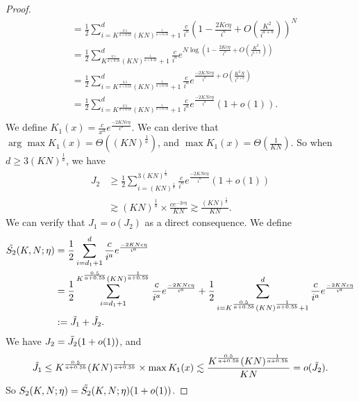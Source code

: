 \begin{proof}
\begin{align*}
    &=\frac{1}{2}\sum_{i=K^{\frac{0.5}{a+0.5b}}(KN)^{\frac{1}{a+0.5b}}+1}^{d}\frac{c}{i^{a}}\left(1-\frac{2Kc\eta}{i^{a}}+O\left(\frac{K^2}{i^{a+b}}\right)\right)^N \\
    &=\frac{1}{2}\sum_{K^{\frac{0.5}{a+0.5b}}(KN)^{\frac{1}{a+0.5b}}+1}^{d}\frac{c}{i^{a}}e^{N\log \left(1-\frac{2Kc\eta}{i^{a}}+O\left(\frac{K^2}{i^{a+b}}\right)\right)} \\
    &=\frac{1}{2}\sum_{i=K^{\frac{0.5}{a+0.5b}}(KN)^{\frac{1}{a+0.5b}}+1}^{d}\frac{c}{i^{a}}e^{\frac{-2KNc\eta}{i^{a}}+O\left(\frac{K^2N}{i^{a+b}}\right)} \\
    &=\frac{1}{2}\sum_{i=K^{\frac{0.5}{a+0.5b}}(KN)^{\frac{1}{a+0.5b}}+1}^{d}\frac{c}{i^{a}}e^{\frac{-2KNc\eta}{i^{a}}}(1+o(1)). \\
\end{align*}
We define $K_1(x) = \frac{c}{x^{a}}e^{\frac{-2KNc\eta}{x^{a}}}$.
We can derive that $\arg\max K_1(x) = \Theta\left((KN)^{\frac{1}{a}}\right)$, and $\max K_1(x) = \Theta\left(\frac{1}{KN}\right)$.
So when $d\geq 3(KN)^{\frac{1}{a}}$, we have
\begin{align*}
    J_2&\geq \frac{1}{2}\sum_{i=(KN)^{\frac{1}{a}}}^{3(KN)^{\frac{1}{a}}}\frac{c}{i^{a}}e^{\frac{-2KNc\eta}{i^{a}}}(1+o(1)) \\
    &\gtrsim (KN)^{\frac{1}{a}}\times\frac{ce^{-2c\eta}}{KN}\gtrsim\frac{(KN)^{\frac{1}{a}}}{KN}.
\end{align*}
We can verify that $J_1 = o(J_2)$ as a direct consequence.
We define 
\begin{align*}
    \Tilde{S_2}(K, N;\eta) &= \frac{1}{2}\sum_{i=d_1+1}^{d}\frac{c}{i^{a}}e^{\frac{-2KNc\eta}{i^{a}}} \\
    &=\frac{1}{2}\sum_{i=d_1+1}^{K^{\frac{0.5}{a+0.5b}}(KN)^{\frac{1}{a+0.5b}}}\frac{c}{i^{a}}e^{\frac{-2KNc\eta}{i^{a}}}+\frac{1}{2}\sum_{i=K^{\frac{0.5}{a+0.5b}}(KN)^{\frac{1}{a+0.5b}}+1}^{d}\frac{c}{i^{a}}e^{\frac{-2KNc\eta}{i^{a}}} \\
    &:=\Tilde{J_1}+\Tilde{J_2}.
\end{align*}
We have $J_2 = \Tilde{J_2}(1+o(1))$, and
\begin{align*}
    \Tilde{J_1}&\leq K^{\frac{0.5}{a+0.5b}}(KN)^{\frac{1}{a+0.5b}}\times \max K_1(x)\lesssim \frac{K^{\frac{0.5}{a+0.5b}}(KN)^{\frac{1}{a+0.5b}}}{KN} = o(\Tilde{J_2}). \\
\end{align*}
So $S_2(K, N;\eta)=\Tilde{S_2}(K, N;\eta)(1+o(1))$.


\end{proof}
